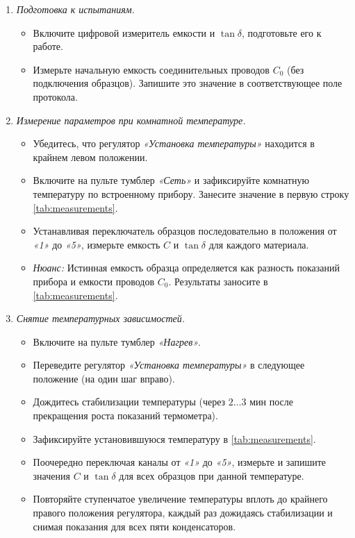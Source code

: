 \begin{enumerate}
    \item \textit{Подготовка к испытаниям.}
    \begin{itemize}
        \item Включите цифровой измеритель емкости и $\tan \delta$, подготовьте его к работе.
        \item Измерьте начальную емкость соединительных проводов $C_0$ (без подключения образцов). Запишите это значение в соответствующее поле протокола.
    \end{itemize}
    
    \item \textit{Измерение параметров при комнатной температуре.}
    \begin{itemize}
        \item Убедитесь, что регулятор \textit{«Установка температуры»} находится в крайнем левом положении.
        \item Включите на пульте тумблер \textit{«Сеть»} и зафиксируйте комнатную температуру по встроенному прибору. Занесите значение в первую строку \cref{tab:measurements}.
        \item Устанавливая переключатель образцов последовательно в положения от \textit{«1»} до \textit{«5»}, измерьте емкость $C$ и $\tan \delta$ для каждого материала. 
        \item \textit{Нюанс:} Истинная емкость образца определяется как разность показаний прибора и емкости проводов $C_0$. Результаты заносите в \cref{tab:measurements}.
    \end{itemize}
    
    \item \textit{Снятие температурных зависимостей.}
    \begin{itemize}
        \item Включите на пульте тумблер \textit{«Нагрев»}.
        \item Переведите регулятор \textit{«Установка температуры»} в следующее положение (на один шаг вправо).
        \item Дождитесь стабилизации температуры (через $2\dots3$ мин после прекращения роста показаний термометра).
        \item Зафиксируйте установившуюся температуру в \cref{tab:measurements}.
        \item Поочередно переключая каналы от \textit{«1»} до \textit{«5»}, измерьте и запишите значения $C$ и $\tan \delta$ для всех образцов при данной температуре.
        \item Повторяйте ступенчатое увеличение температуры вплоть до крайнего правого положения регулятора, каждый раз дожидаясь стабилизации и снимая показания для всех пяти конденсаторов.
    \end{itemize}
    

\end{enumerate}
